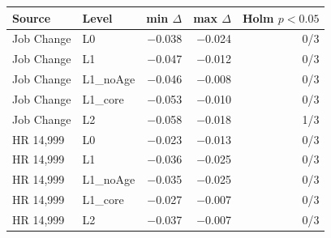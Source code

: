 \begin{tabular}{llrrr}
\hline
Source & Level & min $\Delta$ & max $\Delta$ & Holm $p<0.05$ \\
\hline
Job Change & L0 & $-$0.038 & $-$0.024 & 0/3 \\
Job Change & L1 & $-$0.047 & $-$0.012 & 0/3 \\
Job Change & L1\_noAge & $-$0.046 & $-$0.008 & 0/3 \\
Job Change & L1\_core & $-$0.053 & $-$0.010 & 0/3 \\
Job Change & L2 & $-$0.058 & $-$0.018 & 1/3 \\
HR 14,999 & L0 & $-$0.023 & $-$0.013 & 0/3 \\
HR 14,999 & L1 & $-$0.036 & $-$0.025 & 0/3 \\
HR 14,999 & L1\_noAge & $-$0.035 & $-$0.025 & 0/3 \\
HR 14,999 & L1\_core & $-$0.027 & $-$0.007 & 0/3 \\
HR 14,999 & L2 & $-$0.037 & $-$0.007 & 0/3 \\
\hline
\end{tabular}
